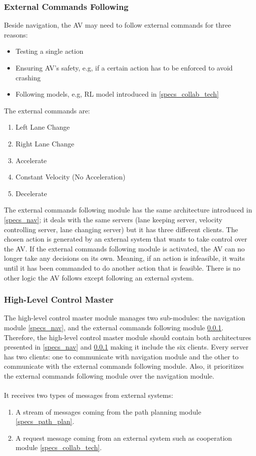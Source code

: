\subsubsection{External Commands Following}
\label{specs_ext_cmds}
Beside navigation, the AV may need to follow external commands for three reasons: 
\begin{itemize}
    \item Testing a single action
    \item Ensuring AV's safety, e.g, if a certain action has to be enforced to avoid crashing
    \item Following models, e.g, RL model introduced in \ref{specs_collab_tech}
\end{itemize}
The external commands are:
\begin{enumerate}
    \item Left Lane Change
    \item Right Lane Change
    \item Accelerate
    \item Constant Velocity (No Acceleration)
    \item Decelerate
\end{enumerate}
The external commands following module has the same architecture introduced in \ref{specs_nav}; it deals with the same servers (lane keeping server, velocity controlling server, lane changing server) but it has three different clients. The chosen action is generated by an external system that wants to take control over the AV. If the external commands following module is activated, the AV can no longer take any decisions on its own. Meaning, if an action is infeasible, it waits until it has been commanded to do another action that is feasible. There is no other logic the AV follows except following an external system.
\subsubsection{High-Level Control Master}
\label{specs_high_lvl_cntrl}
The high-level control master module manages two sub-modules: the navigation module \ref{specs_nav}, and the external commands following module \ref{specs_ext_cmds}. Therefore, the high-level control master module should contain both architectures presented in \ref{specs_nav} and \ref{specs_ext_cmds} making it include the six clients. Every server has two clients: one to communicate with navigation module and the other to communicate with the external commands following module. Also, it prioritizes the external commands following module over the navigation module.
\\ \\
It receives two types of messages from external systems:
\begin{enumerate}
    \item A stream of messages coming from the path planning module \ref{specs_path_plan}.
    \item A request message coming from an external system such as cooperation module \ref{specs_collab_tech}.
\end{enumerate}

